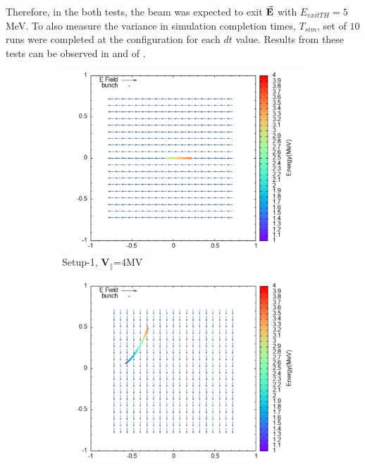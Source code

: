 \documentclass[a4paper,oneside,12pt]{report}
\numberwithin{equation}{chapter}
\begin{document}
{Therefore, in the both tests, the beam was expected to exit $\vec{\textbf{E}}$ with $E_{exitTH} = 5$ MeV. 
To also measure the variance in simulation completion times, $T_{sim}$, set of $10$ runs were completed at the configuration for each $dt$ value.
Results from these tests can be observed in  and  of .
\iffalse \begin{figure}[H]
    \centering
    \begin{subfigure}{0.9\textwidth}
        \centering
        \includegraphics[width=\linewidth]{./figures/rhodoSim/statE_par.png}
        \caption*{Setup-1, $\textbf{V}_{\parallel}$=4MV}
    \end{subfigure}
    \begin{subfigure}{0.9\textwidth}
        \centering
        \includegraphics[width=\linewidth]{./figures/rhodoSim/statE_perp.png}

\end{subfigure}
\end{figure}}
\end{document}

